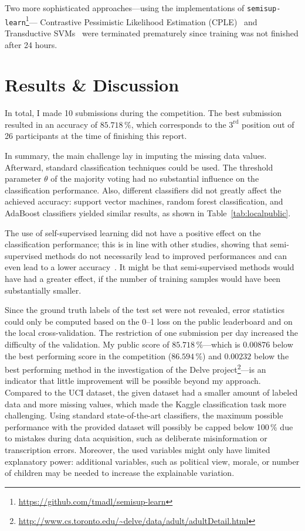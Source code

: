 \documentclass[a4paper,11pt]{article}
\begin{document}
Two more sophisticated approaches---using the implementations of
\texttt{semisup-learn}\footnote{\url{https://github.com/tmadl/semisup-learn}}---
Contrastive Pessimistic Likelihood Estimation
(CPLE)~\cite{loog2016contrastive} and Transductive
SVMs~\cite{bennett1999semi,gieseke2014fast} were terminated
prematurely since training was not finished after 24 hours.

\section{Results \& Discussion}
\label{sec:results}

In total, I made 10 submissions during the competition. The best
submission resulted in an accuracy of $85.718\,\%$, which corresponds
to the $3^{\text{rd}}$ position out of 26 participants at the time of
finishing this report.

In summary, the main challenge lay in imputing the missing data
values. Afterward, standard classification techniques could be
used. The threshold parameter $\theta$ of the majority voting had no
substantial influence on the classification performance. Also,
different classifiers did not greatly affect the achieved accuracy:
support vector machines, random forest classification, and AdaBoost
classifiers yielded similar results, as shown in
Table~\ref{tab:localpublic}.

The use of self-supervised learning did not have a positive effect on
the classification performance; this is in line with other studies,
showing that semi-supervised methods do not necessarily lead to
improved performances and can even lead to a lower
accuracy~\cite{zhu2005semi}. It might be that semi-supervised methods
would have had a greater effect, if the number of training samples
would have been substantially smaller.

Since the ground truth labels of the test set were not revealed, error
statistics could only be computed based on the 0--1 loss on the public
leaderboard and on the local cross-validation. The restriction of one
submission per day increased the difficulty of the validation. My
public score of $85.718\,\%$---which is $0.00876$ below the best
performing score in the competition ($86.594\,\%$) and $0.00232$ below
the best performing method in the investigation of the Delve
project\footnote{\url{http://www.cs.toronto.edu/~delve/data/adult/adultDetail.html}}---is
an indicator that little improvement will be possible beyond my
approach. Compared to the UCI dataset, the given dataset had a smaller
amount of labeled data and more missing values, which made the Kaggle
classification task more challenging. Using standard state-of-the-art
classifiers, the maximum possible performance with the provided
dataset will possibly be capped below 100\,\% due to mistakes during
data acquisition, such as deliberate misinformation or transcription
errors. Moreover, the used variables might only have limited
explanatory power: additional variables, such as political view,
morale, or number of children may be needed to increase the
explainable variation.
\end{document}
